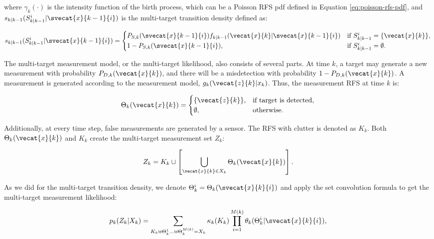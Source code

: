 \noindent where $\gamma_k(\cdot)$ is the intensity function of the birth process, which can be a Poisson RFS pdf defined in Equation \ref{eq:poisson-rfs-pdf}, and $s_{k|k-1}(S_{k|k-1}^i | \svecat{x}{k-1}{i})$ is the multi-target transition density defined as:

\begin{equation}
    s_{k|k-1}(S_{k|k-1}^i | \svecat{x}{k-1}{i}) = \begin{cases}
        P_{S,k}(\svecat{x}{k-1}{i})
            f_{k|k-1}(\vecat{x}{k} | \svecat{x}{k-1}{i}) & \text{if } S_{k|k-1}^i = \{\vecat{x}{k}\}, \\
            1 - P_{S,k}(\svecat{x}{k-1}{i}), & \text{if } S_{k|k-1}^i = \emptyset.
    \end{cases}
\end{equation}

The multi-target measurement model, or the multi-target likelihood, also consists of several parts. At time $k$, a target may generate a new measurement with probability $P_{D,k}(\vecat{x}{k})$, and there will be a misdetection with probability $1 - P_{D,k}(\vecat{x}{k})$. A measurement is generated according to the measurement model, $g_{k}(\vecat{z}{k} | x_{k})$. Thus, the measurement RFS at time $k$ is:

\begin{equation}
    \Theta_k(\vecat{x}{k}) = \begin{cases}
        \{\vecat{z}{k}\}, & \text{if target is detected}, \\
        \emptyset, & \text{otherwise}.
    \end{cases}
\end{equation}

Additionally, at every time step, false measurements are generated by a sensor. The RFS with clutter is denoted as $K_k$. Both $\Theta_k(\vecat{x}{k})$ and $K_k$ create the multi-target measurement set $Z_k$:

\begin{equation}
    Z_k = K_k \cup \left[ \bigcup_{\vecat{x}{k} \in X_k} \Theta_k(\vecat{x}{k}) \right].
\end{equation}

As we did for the multi-target transition density, we denote $\Theta_k^i = \Theta_k(\svecat{x}{k}{i})$ and apply the set convolution formula to get the multi-target measurement likelihood:

\begin{equation}
    p_k(Z_k | X_k) = \sum_{
        K_k \uplus \Theta_{k}^1 \ldots \uplus \Theta_{k}^{M(k)} = X_{k}
    }
    \kappa_k(K_k)
    \prod_{i=1}^{M(k)}
    \theta_{k}(\Theta_{k}^i | \svecat{x}{k}{i}),
\end{equation}

